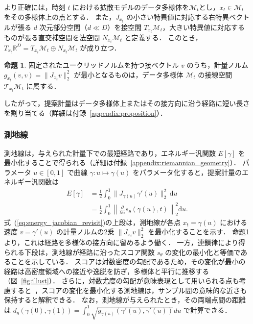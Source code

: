 \documentclass[MIRU,submit]{miru2026j}
\theoremstyle{definition}
\newtheorem{proposition}{命題}
\begin{document}
より正確には，時刻 $t$ における拡散モデルのデータ多様体を$\mathcal{M}_t$とし，$x_t \in \mathcal{M}_t$ をその多様体上の点とする．
また，$J_{x_t}$ の小さい特異値に対応する右特異ベクトルが張る $d$ 次元部分空間（$d \ll D$）を接空間 $T_{x_t}\mathcal{M}_t$，大きい特異値に対応するものが張る直交補空間を法空間 $N_{x_t}\mathcal{M}_t$ と定義する．
このとき，$T_{x_t}\mathbb{R}^D = T_{x_t}\mathcal{M}_t \oplus N_{x_t}\mathcal{M}_t$ が成り立つ．
\vspace{0.5\baselineskip}
\begin{proposition}
    \label{thm:equivalence}
    固定されたユークリッドノルムを持つ接ベクトル $v$ のうち，計量ノルム $g_{x_t}(v,v) = \|J_{x_t} v\|_2^2$ が最小となるものは，データ多様体 $\mathcal{M}_t$ の接線空間 $\mathcal{T}_{x_t}\mathcal{M}_t$ に属する．
\end{proposition}
\vspace{0.5\baselineskip}

したがって，提案計量はデータ多様体上またはその接方向に沿う経路に短い長さを割り当てる（詳細は付録~\ref{appendix:proposition}）．

\subsubsection{測地線}
測地線は，与えられた計量下での最短経路であり，エネルギー汎関数 $E[\gamma]$ を最小化することで得られる（詳細は付録~\ref{appendix:riemannian_geometry}）．
パラメータ $u \in [0,1]$ で曲線 $\gamma:u\mapsto\gamma(u)$ をパラメータ化すると，提案計量のエネルギー汎関数は
\begin{equation}
    \label{eq:energy_jacobian_revisit}
    \begin{aligned}
        \textstyle
        E[\gamma]
        &= \textstyle\frac{1}{2}\int_0^1 \|J_{\gamma(u)} \gamma'(u)\|_2^2\, \mathrm{d}u \\
        &= \textstyle\frac{1}{2}\int_0^1 \left\|\frac{\partial}{\partial u} s_\theta(\gamma(u), t)\right\|_2^2 \mathrm{d}u.
    \end{aligned}
\end{equation}
式~(\ref{eq:energy_jacobian_revisit})の上段は，測地線が各点 $x_t = \gamma(u)$ における速度 $v = \gamma'(u)$ の計量ノルムの2乗 $\|J_{x_t} v\|_2^2$ を最小化することを示す．
命題1より，これは経路を多様体の接方向に留めるよう働く．
一方，連鎖律により得られる下段は，測地線が経路に沿ったスコア関数 $s_\theta$ の変化の最小化と等価であることを示している．
スコアは対数密度の勾配であるため，その変化が最小の経路は高密度領域への接近や逸脱を防ぎ，多様体と平行に推移する（図~\ref{fig:illust}）．
さらに，対数尤度の勾配が意味表現として用いられる点も考慮すると~\cite{Yeh2018,Charpiat2019,Hanawa2021}，スコアの変化を最小化する測地線は，サンプル間の意味的な近さも保持すると解釈できる．
なお，測地線が与えられたとき，その両端点間の距離は $d_g(\gamma(0), \gamma(1)) = \int_0^1 \sqrt{g_{\gamma(u)}(\gamma'(u), \gamma'(u))} du$ で計算できる．
\end{document}
